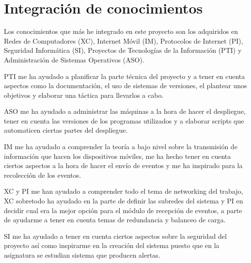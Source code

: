 \chapter{Integración de conocimientos}
Los conocimientos que más he integrado en este proyecto son los adquiridos en Redes de Computadores (XC), Internet Móvil (IM), Protocolos de Internet (PI), Seguridad Informática (SI), Proyectos de Tecnologías de la Información (PTI) y Administración de Sistemas Operativos (ASO).

PTI me ha ayudado a planificar la parte técnica del proyecto y a tener en cuenta aspectos como la documentación, el uso de sistemas de versiones, el plantear unos objetivos y elaborar una táctica para llevarlos a cabo.

ASO me ha ayudado a administrar las máquinas a la hora de hacer el despliegue, tener en cuenta las versiones de los programas utilizados y a elaborar scripts que automaticen ciertas partes del despliegue.

IM me ha ayudado a comprender la teoría a bajo nivel sobre la transmisión de información que hacen los dispositivos móviles, me ha hecho tener en cuenta ciertos aspectos a la hora de hacer el envío de eventos y me ha inspirado para la recolección de los eventos.

XC y PI me han ayudado a comprender todo el tema de networking del trabajo, XC sobretodo ha ayudado en la parte de definir las subredes del sistema y PI en decidir cual era la mejor opción para el módulo de recepción de eventos, a parte de ayudarme a tener en cuenta temas de redundancia y balanceo de carga.

SI me ha ayudado a tener en cuenta ciertos aspectos sobre la seguridad del proyecto así como inspirarme en la creación del sistema puesto que en la asignatura se estudian sistema que producen alertas.
